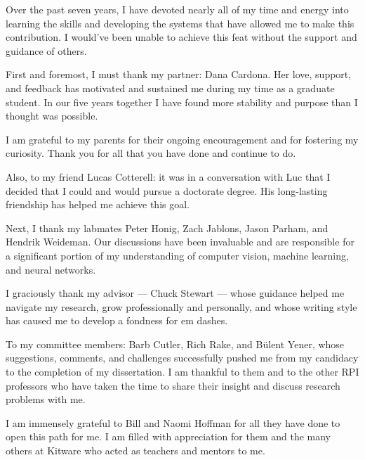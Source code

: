 \documentclass{thesis}
\author{Jonathan P. Crall}
\begin{document}
\titlepage{}

\tableofcontents{}        

\listoftables{}          %
\listoffigures{}         %


Over the past seven years, I have devoted nearly all of my time and energy into learning the skills and
  developing the systems that have allowed me to make this contribution.
I would've been unable to achieve this feat without the support and guidance of others.

First and foremost, I must thank my partner: Dana Cardona.
Her love, support, and feedback has motivated and sustained me during my time as a graduate student.
In our five years together I have found more stability and purpose than I thought was possible.

I am grateful to my parents for their ongoing encouragement and for fostering my curiosity.
Thank you for all that you have done and continue to do.

Also, to my friend Lucas Cotterell:
it was in a conversation with Luc that I decided that I could and would pursue a doctorate degree.
His long-lasting friendship has helped me achieve this goal.

Next, I thank my labmates Peter Honig, Zach Jablons, Jason Parham, and Hendrik Weideman.
Our discussions have been invaluable and are responsible for a significant portion of my understanding of
  computer vision, machine learning, and neural networks.

I graciously thank my advisor --- Chuck Stewart --- whose guidance helped me navigate my research, grow
  professionally and personally, and whose writing style has caused me to develop a fondness for em dashes.

To my committee members:
Barb Cutler, Rich Rake, and Bülent Yener, whose suggestions, comments, and challenges successfully pushed me from
  my candidacy to the completion of my dissertation.
I am thankful to them and to the other RPI professors who have taken the time to share their insight and discuss
  research problems with me.

I am immensely grateful to Bill and Naomi Hoffman for all they have done to open this path for me.
I am filled with appreciation for them and the many others at Kitware who acted as teachers and mentors to me.
\end{document}
